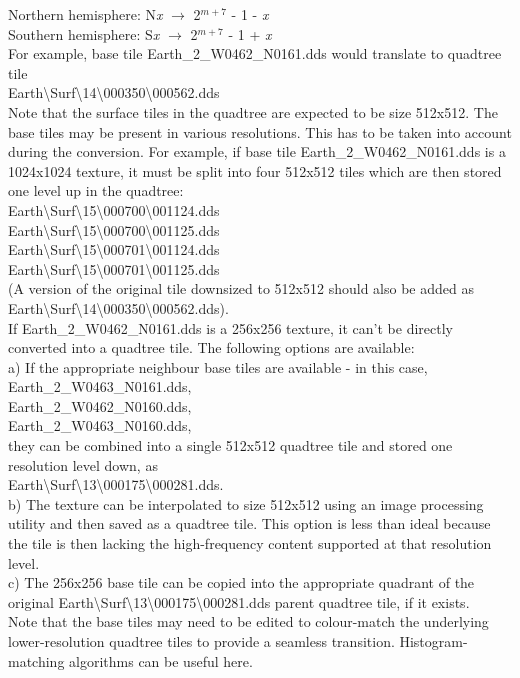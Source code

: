 \documentclass[Orbiter Developer Manual.tex]{subfiles}
\begin{document}
\indent Northern hemisphere: N\textit{x} $\rightarrow$ 2$^{m+7}$ - 1 - \textit{x}\\
\indent Southern hemisphere: S\textit{x} $\rightarrow$ 2$^{m+7}$ - 1 + \textit{x}\\
For example, base tile Earth\_2\_W0462\_N0161.dds would translate to quadtree tile\\
\indent Earth\textbackslash Surf\textbackslash 14\textbackslash 000350\textbackslash 000562.dds\\
Note that the surface tiles in the quadtree are expected to be size 512x512. The base tiles may be present in various resolutions. This has to be taken into account during the conversion. For example, if base tile Earth\_2\_W0462\_N0161.dds is a 1024x1024 texture, it must be split into four 512x512 tiles which are then stored one level up in the quadtree:\\
\indent Earth\textbackslash Surf\textbackslash 15\textbackslash 000700\textbackslash 001124.dds\\
\indent Earth\textbackslash Surf\textbackslash 15\textbackslash 000700\textbackslash 001125.dds\\
\indent Earth\textbackslash Surf\textbackslash 15\textbackslash 000701\textbackslash 001124.dds\\
\indent Earth\textbackslash Surf\textbackslash 15\textbackslash 000701\textbackslash 001125.dds\\
(A version of the original tile downsized to 512x512 should also be added as Earth\textbackslash Surf\textbackslash 14\textbackslash 000350\textbackslash 000562.dds).\\
If Earth\_2\_W0462\_N0161.dds is a 256x256 texture, it can't be directly converted into a quadtree tile. The following options are available:\\
a) If the appropriate neighbour base tiles are available - in this case,\\
\indent Earth\_2\_W0463\_N0161.dds,\\
\indent Earth\_2\_W0462\_N0160.dds,\\
\indent Earth\_2\_W0463\_N0160.dds,\\
they can be combined into a single 512x512 quadtree tile and stored one resolution level down, as\\
\indent Earth\textbackslash Surf\textbackslash 13\textbackslash 000175\textbackslash 000281.dds.\\
b) The texture can be interpolated to size 512x512 using an image processing utility and then saved as a quadtree tile. This option is less than ideal because the tile is then lacking the high-frequency content supported at that resolution level.\\
c) The 256x256 base tile can be copied into the appropriate quadrant of the original Earth\textbackslash Surf\textbackslash 13\textbackslash 000175\textbackslash 000281.dds parent quadtree tile, if it exists.\\
Note that the base tiles may need to be edited to colour-match the underlying lower-resolution quadtree tiles to provide a seamless transition. Histogram-matching algorithms can be useful here.
\end{document}
